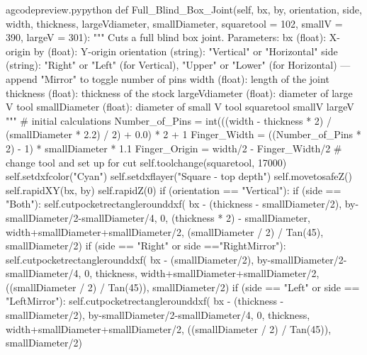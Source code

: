 \documentclass{ltxdoc}
\begin{document}
\lstset{firstnumber=\thegcpy}
\begin{writecode}{a}{gcodepreview.py}{python}
    def Full_Blind_Box_Joint(self, bx, by, orientation, side, width, thickness, largeVdiameter, smallDiameter, squaretool = 102, smallV = 390, largeV = 301):
        """
    Cuts a full blind box joint.
    Parameters:
    bx (float): X-origin
    by (float): Y-origin
    orientation (string): "Vertical" or "Horizontal"
    side (string): "Right" or "Left" (for Vertical), "Upper" or "Lower" (for Horizontal) --- append "Mirror" to toggle number of pins
    width (float): length of the joint
    thickness (float): thickness of the stock
    largeVdiameter (float): diameter of large V tool
    smallDiameter (float): diameter of small V tool
    squaretool
    smallV
    largeV
    """
    # initial calculations
        Number_of_Pins = int(((width - thickness * 2) / (smallDiameter * 2.2) / 2) + 0.0) * 2 + 1
        Finger_Width = ((Number_of_Pins * 2) - 1) * smallDiameter * 1.1
        Finger_Origin = width/2 - Finger_Width/2
    # change tool and set up for cut
        self.toolchange(squaretool, 17000)
        self.setdxfcolor("Cyan")
        self.setdxflayer("Square - top depth")
        self.movetosafeZ()
        self.rapidXY(bx, by)
        self.rapidZ(0)
        if (orientation == "Vertical"):
            if (side == "Both"):
                    self.cutpocketrectanglerounddxf(
                    bx - (thickness - smallDiameter/2), 
                    by-smallDiameter/2-smallDiameter/4, 
                    0, 
                    (thickness * 2) - smallDiameter, 
                    width+smallDiameter+smallDiameter/2, 
                    (smallDiameter / 2) / Tan(45), 
                    smallDiameter/2)
            if (side == "Right" or side =="RightMirror"):
                    self.cutpocketrectanglerounddxf(
                    bx - (smallDiameter/2), 
                    by-smallDiameter/2-smallDiameter/4, 
                    0, 
                    thickness, 
                    width+smallDiameter+smallDiameter/2, 
                    ((smallDiameter / 2) / Tan(45)), 
                    smallDiameter/2)
            if (side == "Left" or side == "LeftMirror"):
                    self.cutpocketrectanglerounddxf(
                    bx - (thickness - smallDiameter/2), 
                    by-smallDiameter/2-smallDiameter/4, 
                    0, 
                    thickness, 
                    width+smallDiameter+smallDiameter/2, 
                    ((smallDiameter / 2) / Tan(45)), 
                    smallDiameter/2)

\end{writecode}
\end{document}
